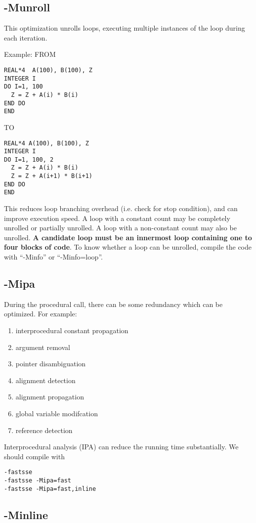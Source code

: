 \subsection{-Munroll}
\label{sec:-munroll}

This optimization unrolls loops, executing multiple instances of the
loop during each iteration. 

Example: FROM
\begin{lstlisting}
REAL*4  A(100), B(100), Z
INTEGER I
DO I=1, 100 
  Z = Z + A(i) * B(i)
END DO
END
\end{lstlisting}
TO
\begin{lstlisting}
REAL*4 A(100), B(100), Z
INTEGER I
DO I=1, 100, 2 
  Z = Z + A(i) * B(i)
  Z = Z + A(i+1) * B(i+1)
END DO
END
\end{lstlisting}
This reduces loop branching overhead (i.e. check for stop condition),
and can improve execution speed. A loop with a constant count may be
completely unrolled or partially unrolled. A loop with a non-constant
count may also be unrolled.
{\bf A candidate loop must be an innermost loop containing one to four
  blocks of code}. To know whether a loop can be unrolled, compile the
code with ``-Minfo'' or ``-Minfo=loop''.



\subsection{-Mipa}
\label{sec:-mipa}

During the procedural call, there can be some redundancy which can be
optimized. For example: 
\begin{enumerate}
\item interprocedural constant propagation
\item argument removal
\item pointer disambiguation
\item alignment detection
\item alignment propagation
\item global variable modifcation
\item reference detection
\end{enumerate}
Interprocedural analysis (IPA) can reduce the running time
substantially. We should compile with 
\begin{verbatim}
-fastsse
-fastsse -Mipa=fast
-fastsse -Mipa=fast,inline
\end{verbatim}

\subsection{-Minline}
\label{sec:-minline}

